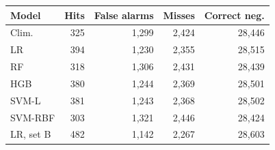 \begin{tabular}{lrrrr}
\toprule
Model & Hits & False alarms & Misses & Correct neg. \\
\midrule
Clim. & 325 & 1,299 & 2,424 & 28,446 \\
LR & 394 & 1,230 & 2,355 & 28,515 \\
RF & 318 & 1,306 & 2,431 & 28,439 \\
HGB & 380 & 1,244 & 2,369 & 28,501 \\
SVM-L & 381 & 1,243 & 2,368 & 28,502 \\
SVM-RBF & 303 & 1,321 & 2,446 & 28,424 \\
LR, set B & 482 & 1,142 & 2,267 & 28,603 \\
\bottomrule
\end{tabular}
